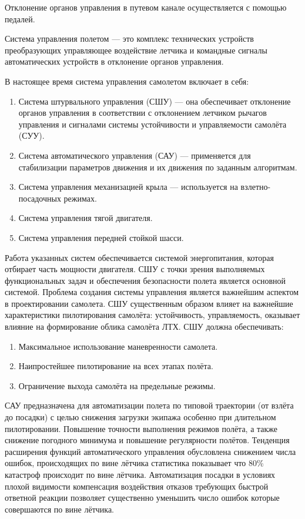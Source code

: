 \documentclass{article}
\begin{document}
Отклонение органов управления в путевом канале осуществляется с помощью
педалей.

Система управления полетом --- это комплекс технических устройств преобразующих
управляющее воздействие летчика и командные сигналы автоматических устройств в
отклонение органов управления.

В настоящее время система управления самолетом включает в себя:
\begin{enumerate}
	\item Система штурвального управления (СШУ) --- она обеспечивает отклонение
	      органов управления в соответствии с отклонением летчиком рычагов
	      управления и сигналами системы устойчивости и управляемости самолёта
	      (СУУ).
	\item Система автоматического управления (САУ) --- применяется для
	      стабилизации параметров движения и их движения по заданным алгоритмам.
	\item Система управления механизацией крыла --- используется на
	      взлетно-посадочных режимах.
	\item Система управления тягой двигателя.
	\item Система управления передней стойкой шасси.
\end{enumerate}

Работа указанных систем обеспечивается системой энергопитания, которая отбирает
часть мощности двигателя. СШУ с точки зрения выполняемых функциональных задач и
обеспечения безопасности полета является основной системой. Проблема создания
системы управления является важнейшим аспектом в проектировании самолета. СШУ
существенным образом влияет на важнейшие характеристики пилотирования самолёта:
устойчивость, управляемость, оказывает влияние на формирование облика самолёта
ЛТХ. СШУ должна обеспечивать:
\begin{enumerate}
	\item Максимальное использование маневренности самолета.
	\item Наипростейшее пилотирование на всех этапах полёта.
	\item Ограничение выхода самолёта на предельные режимы.
\end{enumerate}

САУ предназначена для автоматизации полета по типовой траектории (от взлёта до
посадки) с целью снижения загрузки экипажа особенно при длительном
пилотировании. Повышение точности выполнения режимов полёта, а также снижение
погодного минимума и повышение регулярности полётов. Тенденция расширения
функций автоматического управления обусловлена снижением числа ошибок,
происходящих по вине лётчика статистика показывает что 80\% катастроф
происходит по вине лётчика. Автоматизация посадки в условиях плохой видимости
компенсация воздействия отказов требующих быстрой ответной реакции позволяет
существенно уменьшить число ошибок которые совершаются по вине лётчика.
\end{document}
